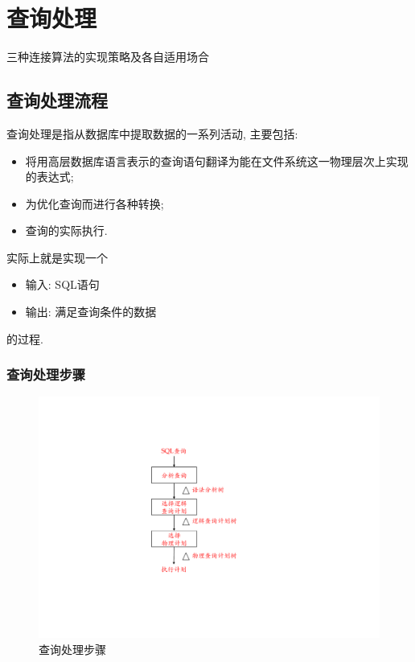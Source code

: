\chapter{查询处理}

\begin{introduction}[期末考试提纲]
    \item 三种连接算法的实现策略及各自适用场合
\end{introduction}

\section{查询处理流程}

\begin{definition}[查询处理]
    查询处理是指从数据库中提取数据的一系列活动, 主要包括:
    \begin{itemize}
        \item 将用高层数据库语言表示的查询语句翻译为能在文件系统这一物理层次上实现的表达式;
        \item 为优化查询而进行各种转换;
        \item 查询的实际执行.
    \end{itemize}
    实际上就是实现一个
    \begin{itemize}
        \item 输入: SQL语句
        \item 输出: 满足查询条件的数据
    \end{itemize}
    的过程.
\end{definition}


\subsection{查询处理步骤}


\begin{figure}[H]
    \centering
    \includegraphics[width=.8\textwidth]{figure/chaxun.pdf}
    \caption{查询处理步骤}
\end{figure}


